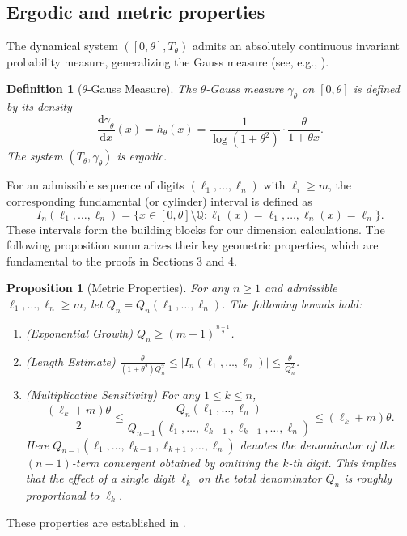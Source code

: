 \documentclass{article}
\newtheorem{proposition}[theorem]{Proposition}
\newtheorem{definition}[theorem]{Definition}
\numberwithin{equation}{section}
\begin{document}
\subsection{Ergodic and metric  properties}

The dynamical system $([0, \theta], T_\theta)$ admits an absolutely continuous invariant probability measure, generalizing the Gauss measure {(see, e.g., \cite{CR-2003})}.

\begin{definition}[$\theta$-Gauss Measure]
The $\theta$-Gauss measure $\gamma_\theta$ on $[0, \theta]$ is defined by its density
\[
\frac{\mathrm{d}\gamma_\theta}{\mathrm{d}x}(x) = h_\theta(x) = \frac{1}{\log(1+\theta^2)} \cdot \frac{\theta}{1 + \theta x}.
\]
The system $(T_\theta, \gamma_\theta)$ is ergodic.
\end{definition}

For an admissible sequence of digits $(\ell_1, \ldots, \ell_n)$ with $\ell_i \geq m$, the corresponding fundamental (or cylinder) interval is defined as
\[
I_n(\ell_1, \ldots, \ell_n) = \{x \in [0, \theta] \setminus \mathbb{Q} : \ell_1(x) = \ell_1, \ldots, \ell_n(x) = \ell_n\}.
\]
These intervals form the building blocks for our dimension calculations. The following proposition summarizes their key geometric properties, which are fundamental to the proofs in Sections 3 and 4.

\begin{proposition}[Metric Properties]\label{prop:basic}
For any $n \geq 1$ and admissible $\ell_1, \ldots, \ell_n \geq m$, let $Q_n = Q_n(\ell_1, \ldots, \ell_n)$. The following bounds hold:
\begin{enumerate}
    \item[(a)] (Exponential Growth) $Q_n \geq (m+1)^{\frac{n-1}{2}}$.
    \item[(b)] (Length Estimate) $\displaystyle \frac{\theta}{(1+\theta^2)Q_n^2} \leq |I_n(\ell_1, \ldots, \ell_n)| \leq \frac{\theta}{Q_n^2}$.
    \item[(c)] (Multiplicative Sensitivity) For any $1 \leq k \leq n$,
    \[
    \frac{(\ell_k+m)\theta}{2} \leq \frac{Q_n(\ell_1, \ldots, \ell_n)}{Q_{n-1}(\ell_1, \ldots, \ell_{k-1}, \ell_{k+1}, \ldots, \ell_n)} \leq (\ell_k+m)\theta.
    \]
    {Here $Q_{n-1}(\ell_1, \ldots, \ell_{k-1}, \ell_{k+1}, \ldots, \ell_n)$ denotes the denominator of the $(n-1)$-term convergent obtained by omitting the $k$-th digit.}
    This implies that the effect of a single digit $\ell_k$ on the total denominator $Q_n$ is roughly proportional to $\ell_k$.
\end{enumerate}
\end{proposition}
\noindent These properties are established in \cite{SebeLascuBilel2}.
\end{document}
